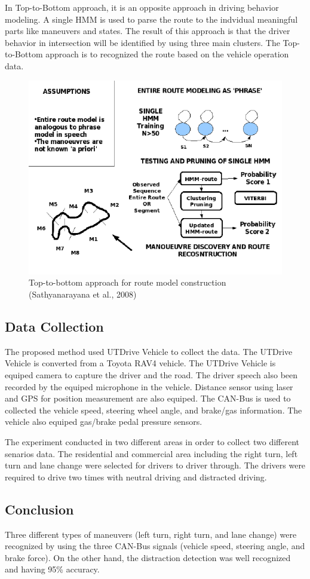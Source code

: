 In Top-to-Bottom approach, it is an opposite approach in driving behavior modeling. A single HMM is used to parse the route to the indvidual meaningful parts like maneuvers and states. The result of this approach is that the driver behavior in intersection will be identified by using three main clusters. The Top-to-Bottom approach is to recognized the route based on the vehicle operation data.

\begin{figure}[hbt!]\centering
\includegraphics[width=.75\textwidth]{image/ToptoBottom}
\caption{Top-to-bottom approach for route model construction (Sathyanarayana et al., 2008)}
\end{figure}

\subsection{Data Collection}
The proposed method used UTDrive Vehicle to collect the data. The UTDrive Vehicle is converted from a Toyota RAV4 vehicle. The UTDrive Vehicle is equiped camera to capture the driver and the road. The driver speech also been recorded by the equiped microphone in the vehicle. Distance sensor using laser and GPS for position measurement are also equiped. The CAN-Bus is used to collected the vehicle speed, steering wheel angle, and brake/gas information. The vehicle also equiped gas/brake pedal pressure sensors. 

The experiment conducted in two different areas in order to collect two different senarios data. The residential and commercial area including the right turn, left turn and lane change were selected for drivers to driver through. The drivers were required to drive two times with neutral driving and distracted driving. 
 
\subsection{Conclusion}
Three different types of maneuvers (left turn, right turn, and lane change) were recognized by using the three CAN-Bus signals (vehicle speed, steering angle, and brake force). On the other hand, the distraction detection was well recognized and having 95\% accuracy.


